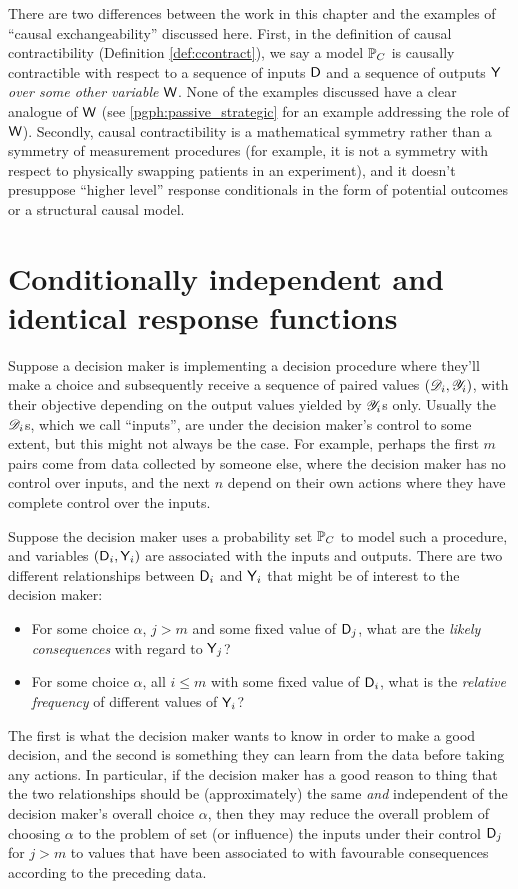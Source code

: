 There are two differences between the work in this chapter and the examples of ``causal exchangeability'' discussed here. First, in the definition of causal contractibility (Definition \ref{def:ccontract}), we say a model $\mathbb{P}_C$ is causally contractible with respect to a sequence of inputs $\mathsf{D}$ and a sequence of outputs $\mathsf{Y}$ \emph{over some other variable} $\mathsf{W}$. None of the examples discussed have a clear analogue of $\mathsf{W}$ (see \ref{pgph:passive_strategic} for an example addressing the role of $\mathsf{W}$).  Secondly, causal contractibility is a mathematical symmetry rather than a symmetry of measurement procedures (for example, it is not a symmetry with respect to physically swapping patients in an experiment), and it doesn't presuppose ``higher level'' response conditionals in the form of potential outcomes or a structural causal model.

\section[Response functions]{Conditionally independent and identical response functions}\label{sec:response_functions}

Suppose a decision maker is implementing a decision procedure where they'll make a choice and subsequently receive a sequence of paired values $(\mathscr{D}_i,\mathscr{Y}_i)$, with their objective depending on the output values yielded by $\mathscr{Y}_i$s only. Usually the $\mathscr{D}_i$s, which we call ``inputs'', are under the decision maker's control to some extent, but this might not always be the case. For example, perhaps the first $m$ pairs come from data collected by someone else, where the decision maker has no control over inputs, and the next $n$ depend on their own actions where they have complete control over the inputs.

Suppose the decision maker uses a probability set $\mathbb{P}_C$ to model such a procedure, and variables $(\mathsf{D}_i,\mathsf{Y}_i)$ are associated with the inputs and outputs. There are two different relationships between $\mathsf{D}_i$ and $\mathsf{Y}_i$ that might be of interest to the decision maker:
\begin{itemize}
    \item For some choice $\alpha$, $j>m$ and some fixed value of $\mathsf{D}_j$, what are the \emph{likely consequences} with regard to $\mathsf{Y}_j$?
    \item For some choice $\alpha$, all $i\leq m$ with some fixed value of $\mathsf{D}_i$, what is the \emph{relative frequency} of different values of $\mathsf{Y}_i$?
\end{itemize}
The first is what the decision maker wants to know in order to make a good decision, and the second is something they can learn from the data before taking any actions. In particular, if the decision maker has a good reason to thing that the two relationships should be (approximately) the same \emph{and} independent of the decision maker's overall choice $\alpha$, then they may reduce the overall problem of choosing $\alpha$ to the problem of set (or influence) the inputs under their control $\mathsf{D}_j$ for $j>m$ to values that have been associated to with favourable consequences according to the preceding data.

